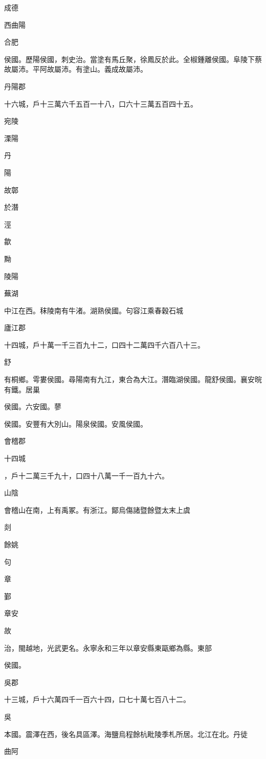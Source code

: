 \begin{pinyinscope}
成德

西曲陽

合肥

侯國。歷陽侯國，刺史治。當塗有馬丘聚，徐鳳反於此。全椒鍾離侯國。阜陵下蔡故屬沛。平阿故屬沛。有塗山。義成故屬沛。

丹陽郡

十六城，戶十三萬六千五百一十八，口六十三萬五百四十五。

宛陵

溧陽

丹

陽

故鄣

於潛

涇

歙

黝

陵陽

蕪湖

中江在西。秣陵南有牛渚。湖熟侯國。句容江乘春穀石城

廬江郡

十四城，戶十萬一千三百九十二，口四十二萬四千六百八十三。

舒

有桐鄉。雩婁侯國。尋陽南有九江，東合為大江。潛臨湖侯國。龍舒侯國。襄安晥有鐵。居巢

侯國。六安國。蓼

侯國。安豐有大別山。陽泉侯國。安風侯國。

會稽郡

十四城

，戶十二萬三千九十，口四十八萬一千一百九十六。

山陰

會稽山在南，上有禹冢。有浙江。鄮烏傷諸暨餘暨太末上虞

剡

餘姚

句

章

鄞

章安

故

治，閩越地，光武更名。永寧永和三年以章安縣東甌鄉為縣。東部

侯國。

吳郡

十三城，戶十六萬四千一百六十四，口七十萬七百八十二。

吳

本國。震澤在西，後名具區澤。海鹽烏程餘杭毗陵季札所居。北江在北。丹徒

曲阿


\end{pinyinscope}
